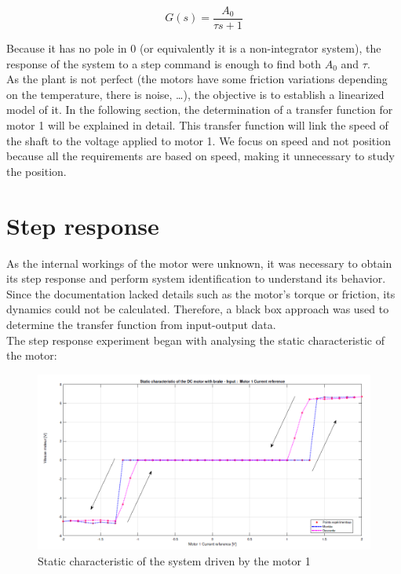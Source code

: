 \begin{equation}
    G(s) = \frac{A_0}{\tau s + 1}
    \label{eq:1_st_order_TF}
\end{equation}

Because it has no pole in $0$ (or equivalently it is a non-integrator system), the response of the system to a step
command is enough to find both $A_0$ and $\tau$.\\

As the plant is not perfect (the motors have some friction variations depending on the temperature, there is noise, \dots), the objective is to establish a linearized model of it. 
In the following section, the determination of a transfer function for motor 1 will be explained in detail. 
This transfer function will link the speed of the shaft to the voltage applied to motor 1. 
We focus on speed and not position because all the requirements are based on speed, making it unnecessary to study the position.\\

\section{Step response}

As the internal workings of the motor were unknown, it was necessary to obtain its step response and perform system identification to understand its behavior. 
Since the documentation lacked details such as the motor's torque or friction, its dynamics could not be calculated. 
Therefore, a black box approach was used to determine the transfer function from input-output data.\\

The step response experiment began with analysing the static characteristic of the motor:

\begin{figure}[H]
    \centering
    \includegraphics[height=\textheight/4]{Pictures/static_characteristic_motor_1.png}
    \caption{Static characteristic of the system driven by the motor 1}
    \label{fig:static_characteristic_motor_1}
\end{figure}

